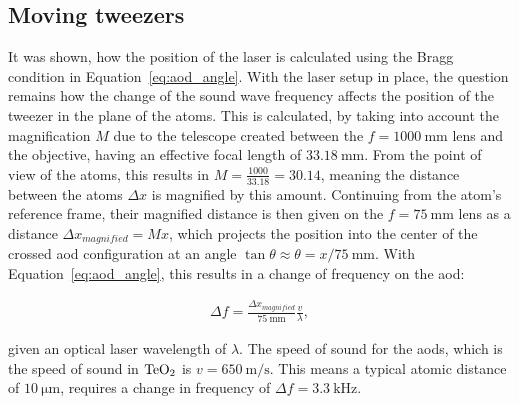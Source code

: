 \subsection{Moving tweezers}

It was shown, how the position of the laser is calculated using the Bragg condition in Equation~\ref{eq:aod_angle}. With the laser setup in place, the question remains how the change of the sound wave frequency affects the position of the tweezer in the plane of the atoms. This is calculated, by taking into account the magnification $M$ due to the telescope created between the $f=\SI{1000}{\milli\meter}$ lens and the objective, having an effective focal length of $\SI{33.18}{\milli\meter}$. From the point of view of the atoms, this results in $M=\frac{1000}{33.18} = 30.14$, meaning the distance between the atoms $\Delta x$ is magnified by this amount. Continuing from the atom's reference frame, their magnified distance is then given on the $f=\SI{75}{\milli\meter}$ lens as a distance $\Delta x_{magnified} = Mx$, which projects the position into the center of the crossed \ac{aod} configuration at an angle $\tan{\theta} \approx \theta = x / \SI{75}{\milli\meter}$.
With Equation~\ref{eq:aod_angle}, this results in a change of frequency on the \ac{aod}:

\begin{align}
	\Delta f = \frac{\Delta x_{magnified}}{\SI{75}{\milli\meter}} \frac{v}{\lambda},
\end{align}

given an optical laser wavelength of $\lambda$. The speed of sound for the \acp{aod}, which is the speed of sound in $\ce{TeO2}$ is $v=\SI{650}{\meter\per\second}$. This means a typical atomic distance of $\SI{10}{\micro\meter}$, requires a change in frequency of $\Delta f = \SI{3.3}{\kilo\hertz}$.

